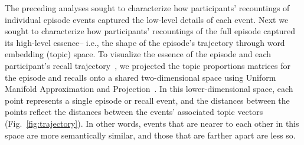 \documentclass[10pt]{article}
\begin{document}
The preceding analyses sought to characterize how participants' recountings of individual episode events captured the low-level details of each event.  Next we sought to characterize how participants' recountings of the full episode captured its high-level essence-- i.e., the shape of the episode's trajectory through word embedding (topic) space.  To visualize the essence of the episode and each participant's recall trajectory~\citep{HeusEtal18a}, we projected the topic proportions matrices for the episode and recalls onto a shared two-dimensional space using Uniform Manifold Approximation and Projection~\citep[UMAP; ][]{McInEtal18}.  In this lower-dimensional space, each point represents a single episode or recall event, and the distances between the points reflect the distances between the events' associated topic vectors (Fig.~\ref{fig:trajectory}). In other words, events that are nearer to each other in this space are more semantically similar, and those that are farther apart are less so.
\end{document}
